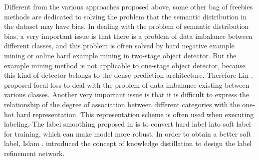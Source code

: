\documentclass[10pt,twocolumn,letterpaper]{article}
\begin{document}
Different from the various approaches proposed above, some other bag of freebies methods are dedicated to solving the problem that the semantic distribution in the dataset may have bias. In dealing with the problem of semantic distribution bias, a very important issue is that there is a problem of data imbalance between different classes, and this problem is often solved by hard negative example mining \cite{sung1998example} or online hard example mining \cite{shrivastava2016training} in two-stage object detector. But the example mining method is not applicable to one-stage object detector, because this kind of detector belongs to the dense prediction architecture. Therefore Lin \etal. \cite{lin2017focal} proposed focal loss to deal with the problem of data imbalance existing between various classes. Another very important issue is that it is difficult to express the relationship of the degree of association between different categories with the one-hot hard representation. This representation scheme is often used when executing labeling. The label smoothing proposed in \cite{szegedy2016rethinking} is to convert hard label into soft label for training, which can make model more robust. In order to obtain a better soft label, Islam \etal. \cite{islam2017label} introduced the concept of knowledge distillation to design the label refinement network.
\end{document}
